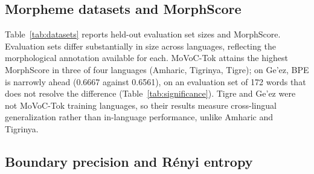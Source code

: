 \documentclass[11pt]{article}
\begin{document}
\subsection{Morpheme datasets and MorphScore}

\begin{table}[t]
  \centering
  
  \caption{Morpheme-annotated evaluation sets and MorphScore across BPE,
           WordPiece and MoVoC-Tok, on words held out from MoVoC-Tok's training
           morpheme resource (Section~\ref{sec:heldout}). MorphScore is the
           micro-averaged recall of gold morpheme boundaries, excluding words
           the tokenizer left unsegmented. Higher is better. For Tigre and
           Ge'ez ($*$) the Tigrinya MoVoC-Tok is applied cross-lingually.}
  \label{tab:datasets}
\end{table}

Table~\ref{tab:datasets} reports held-out evaluation set sizes and MorphScore.
Evaluation sets differ substantially in size across languages, reflecting the
morphological annotation available for each. MoVoC-Tok attains the highest
MorphScore in three of four languages (Amharic, Tigrinya, Tigre); on Ge'ez,
BPE is narrowly ahead (0.6667 against 0.6561), on an evaluation set of 172
words that does not resolve the difference (Table~\ref{tab:significance}).
Tigre and Ge'ez were not MoVoC-Tok training languages, so their results measure
cross-lingual generalization rather than in-language performance, unlike
Amharic and Tigrinya.

\subsection{Boundary precision and R\'enyi entropy}

\begin{table}[t]
  \centering
  
  \caption{Morpheme boundary precision and R\'enyi entropy ($\alpha = 2$) for
           32k vocabularies across BPE, WordPiece and MoVoC-Tok, on words held
           out from MoVoC-Tok's training morpheme resource
           (Section~\ref{sec:heldout}). Precision uses exact character-offset
           matching against gold morpheme boundaries. For Tigre and Ge'ez ($*$)
           the Tigrinya MoVoC-Tok is applied cross-lingually.}
  \label{tab:intrinsic}
\end{table}

\begin{table}[t]
  \centering
  \small
  
  \caption{Paired bootstrap over held-out words (10,000 resamples, shared
           resampling index), MoVoC-Tok minus BPE. Intervals are 95\%
           percentile intervals of the difference. $*$ marks cross-lingual
           application of the Tigrinya MoVoC-Tok.}
  \label{tab:significance}
\end{table}
\end{document}
